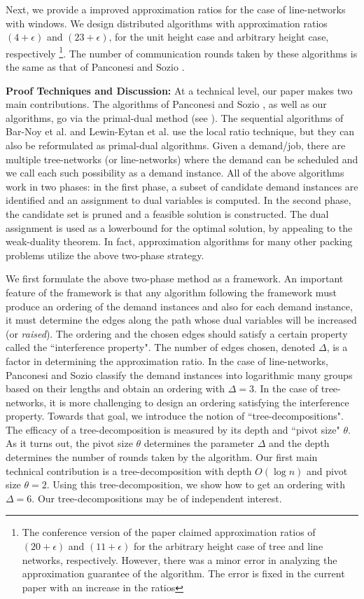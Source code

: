 \documentclass[11pt]{article}
\begin{document}
Next, we provide a improved approximation ratios
for the case of line-networks with windows. We design distributed algorithms
with approximation ratios $(4+\epsilon)$ and $(23+\epsilon)$, for the unit height case
and arbitrary height case, respectively
\footnote{The conference version of the paper \cite{podc} claimed approximation ratios of $(20+\epsilon)$
and $(11+\epsilon)$ for the arbitrary height case of tree and line networks, respectively.
However, there was a minor error in analyzing the approximation guarantee of the algorithm.
The error is fixed in the current paper with an increase in the ratios}.
The number of communication rounds taken by these algorithms is the same as that
of Panconesi and Sozio \cite{Pancj}. 

\noindent
{\bf Proof Techniques and Discussion: }
At a technical level, our paper makes two main contributions. 
The algorithms of Panconesi and Sozio \cite{Pancj}, as well as our algorithms,
go via the primal-dual method (see \cite{ShmoysBook}). The sequential algorithms of Bar-Noy et al. \cite{Bar-Noy-Jacm}
and Lewin-Eytan et al. \cite{Lewin-Eytan} use the local ratio technique, but they
can also be reformulated as primal-dual algorithms. Given a demand/job,
there are multiple tree-networks (or line-networks) where the demand can be scheduled and we call each such possibility
as a demand instance. All of the above algorithms work in two phases: 
in the first phase, a subset of candidate demand instances are identified
and an assignment to dual variables is computed. In the second phase,
the candidate set is pruned and a feasible solution is constructed.
The dual assignment is used as a lowerbound for the optimal solution,
by appealing to the weak-duality theorem. In fact, approximation algorithms
for many other packing problems utilize the above two-phase strategy.

We first formulate the above two-phase method as a framework.
An important feature of the framework is that any algorithm following the framework
must produce an ordering of the demand instances and also for each demand instance,
it must determine the edges along the path whose dual variables will be increased (or {\em raised}).
The ordering and the chosen edges should satisfy a certain property called the ``interference property".
The number of edges chosen, denoted $\Delta$, is a factor in determining the approximation ratio.
In the case of line-networks, Panconesi and Sozio \cite{Pancj} 
classify the demand instances into logarithmic many groups based on their lengths
and obtain an ordering with $\Delta=3$.
In the case of tree-networks, it is more challenging to design an ordering
satisfying the interference property. Towards that goal, we introduce the notion of
``tree-decompositions". 
The efficacy of a tree-decomposition is measured by its
depth and ``pivot size" $\theta$. As it turns out, the pivot size $\theta$ determines the parameter $\Delta$
and the depth determines the number of rounds taken by the algorithm. 
Our first main technical contribution is a tree-decomposition with depth $O(\log n)$ and
pivot size $\theta=2$. Using this tree-decomposition, we show how to get an ordering with $\Delta=6$.
Our tree-decompositions may be of independent interest.
\end{document}
